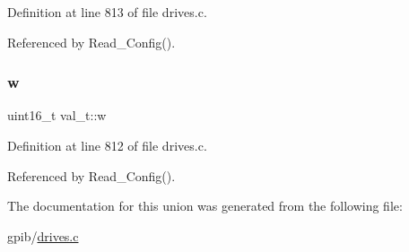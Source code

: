 Definition at line 813 of file drives.\+c.



Referenced by Read\+\_\+\+Config().

\mbox{\label{unionval__t_a35ceb0f111824a2835370671131c38c0}} 
\subsubsection{\texorpdfstring{w}{w}}
{\footnotesize\ttfamily uint16\+\_\+t val\+\_\+t\+::w}



Definition at line 812 of file drives.\+c.



Referenced by Read\+\_\+\+Config().



The documentation for this union was generated from the following file\+:\begin{DoxyCompactItemize}
\item 
gpib/\hyperlink{drives_8c}{drives.\+c}\end{DoxyCompactItemize}

